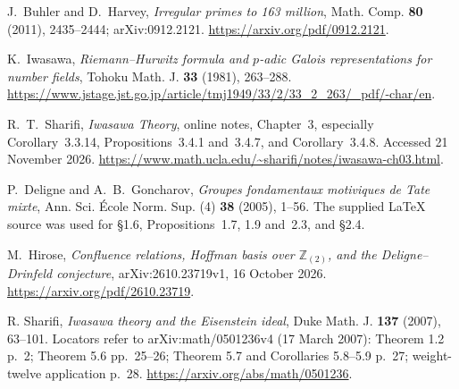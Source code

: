 J.~Buhler and D.~Harvey, \emph{Irregular primes to 163 million},
Math. Comp. \textbf{80} (2011), 2435--2444;
arXiv:0912.2121.
\url{https://arxiv.org/pdf/0912.2121}.

K.~Iwasawa, \emph{Riemann--Hurwitz formula and $p$-adic Galois
representations for number fields},
Tohoku Math. J. \textbf{33} (1981), 263--288.
\url{https://www.jstage.jst.go.jp/article/tmj1949/33/2/33_2_263/_pdf/-char/en}.

R.~T.~Sharifi, \emph{Iwasawa Theory}, online notes, Chapter~3,
especially Corollary~3.3.14, Propositions~3.4.1 and~3.4.7,
and Corollary~3.4.8. Accessed 21 November 2026.
\url{https://www.math.ucla.edu/~sharifi/notes/iwasawa-ch03.html}.

P.~Deligne and A.~B.~Goncharov,
\emph{Groupes fondamentaux motiviques de Tate mixte},
Ann. Sci. \'Ecole Norm. Sup. (4) \textbf{38} (2005), 1--56.
The supplied LaTeX source was used for \S1.6,
Propositions~1.7, 1.9 and~2.3, and \S2.4.

M.~Hirose, \emph{Confluence relations, Hoffman basis over $\mathbb Z_{(2)}$,
and the Deligne--Drinfeld conjecture},
arXiv:2610.23719v1, 16 October 2026.
\url{https://arxiv.org/pdf/2610.23719}.

 R. Sharifi, \emph{Iwasawa theory and the Eisenstein ideal}, Duke Math. J. \textbf{137} (2007), 63--101. Locators refer to arXiv:math/0501236v4 (17 March 2007): Theorem 1.2 p.~2; Theorem 5.6 pp.~25--26; Theorem 5.7 and Corollaries 5.8--5.9 p.~27; weight-twelve application p.~28. \url{https://arxiv.org/abs/math/0501236}.
